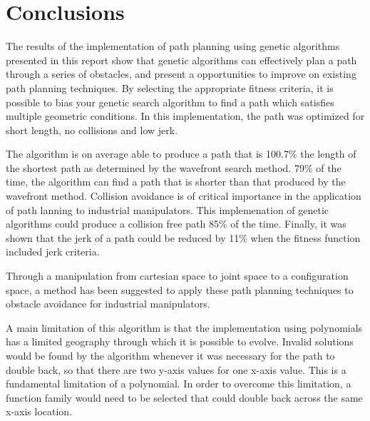 \section{Conclusions}
The results of the implementation of path planning using genetic algorithms presented in this report show that genetic algorithms can effectively plan a path through a series of obstacles, and present a opportunities to improve on existing path planning techniques. By selecting the appropriate fitness criteria, it is possible to bias your genetic search algorithm to find a path which satisfies multiple geometric conditions. In this implementation, the path was optimized for short length, no collisions and low jerk. 

The algorithm is on average able to produce a path that is 100.7\% the length of the shortest path as determined by the wavefront search method. 79\% of the time, the algorithm can find a path that is shorter than that produced by the wavefront method. Collision avoidance is of critical importance in the application of path lanning to industrial manipulators. This implemenation of genetic algorithms could produce a collision free path 85\% of the time. Finally, it was shown that the jerk of a path could be reduced by 11\% when the fitness function included jerk criteria.

Through a manipulation from cartesian space to joint space to a configuration space, a method has been suggested to apply these path planning techniques to obstacle avoidance for industrial manipulators.

A main limitation of this algorithm is that the implementation using polynomials has a limited geography through which it is possible to evolve. Invalid solutions would be found by the algorithm whenever it was necessary for the path to double back, so that there are two y-axis values for one x-axis value. This is a fundamental limitation of a polynomial. In order to overcome this limitation, a function family would need to be selected that could double back across the same x-axis location.